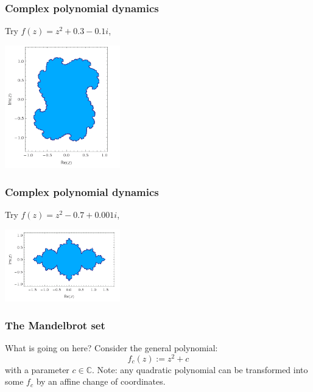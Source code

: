 \documentclass{beamer} %
\theoremstyle{definition} %
\newcommand{\Cplx}{\mathbb{C}}
\begin{document}
\begin{frame}\frametitle{Complex polynomial dynamics}
    Try $f(z) = z^2+0.3-0.1i$,\\
    \begin{center}
        \includegraphics[width=50mm]{img/julia03-01-filled.png}
    \end{center}
\end{frame}

\begin{frame}\frametitle{Complex polynomial dynamics}
    Try $f(z) = z^2-0.7+0.001i$,\\
    \begin{center}
        \includegraphics[width=50mm]{img/julia-07001-filled.png}
    \end{center}
\end{frame}

\begin{frame}\frametitle{The Mandelbrot set}
    What is going on here?
    Consider the general polynomial:
    \begin{equation*}
        f_c(z) := z^2+c
    \end{equation*}
    with a parameter $c \in \Cplx$.
    Note: any quadratic polynomial can be transformed into some $f_c$ by an affine change of coordinates. 
\end{frame}
\end{document}
